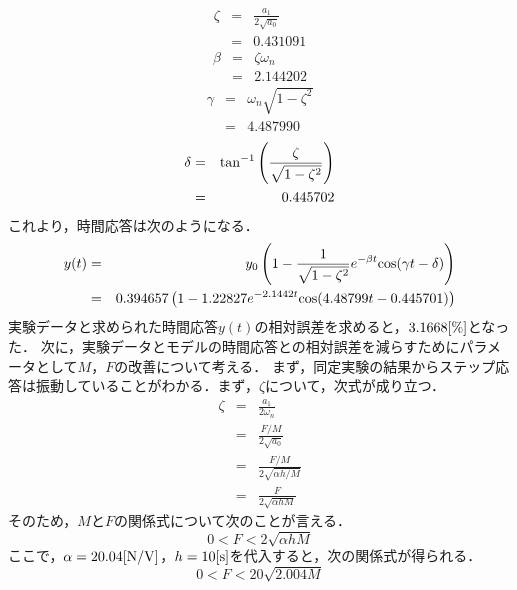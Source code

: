 \documentclass[12pt]{jsarticle}
\begin{document}
\begin{eqnarray}
  \label{StepResponse_calculate_zeta}
  \zeta &=& \frac{a_1}{2\sqrt{a_0}} \\
        &=& 0.431091 \nonumber
\end{eqnarray}
\begin{eqnarray}
  \label{StepResponse_calculate_beta}
  \beta &=& \zeta \omega_n \\
        &=& 2.144202 \nonumber
\end{eqnarray}
\begin{eqnarray}
  \label{StepResponse_calculate_gamma}
  \gamma &=& \omega_n\sqrt{1-\zeta^2} \\
         &=& 4.487990 \nonumber
\end{eqnarray}
\begin{eqnarray}
  \label{StepResponse_calculate_delta}
  \delta &=& {\rm tan}^{-1}\left(\frac{\zeta}{\sqrt{1-\zeta^2}}\right) \\
         &=& 0.445702 \nonumber
\end{eqnarray}
これより，時間応答は次のようになる．
\begin{eqnarray}
  \label{Response_y_t}
  y(t) &=& y_0\left(1 - \frac{1}{\sqrt{1-\zeta^2}}e^{-\beta t}{\rm cos}(\gamma t - \delta)\right) \\
       &=& 0.394657\left(1 - 1.22827e^{-2.1442 t}{\rm cos}(4.48799 t - 0.445701)\right) \nonumber
\end{eqnarray}
実験データと求められた時間応答$y(t)$の相対誤差を求めると，$3.1668{\rm [\%]}$となった．
次に，実験データとモデルの時間応答との相対誤差を減らすためにパラメータとして$M$，$F$の改善について考える．
まず，同定実験の結果からステップ応答は振動していることがわかる．まず，$\zeta$について，次式が成り立つ．
\begin{eqnarray}
  \label{MF_zeta}
  \zeta &=& \frac{a_1}{2\omega_n} \\
        &=& \frac{F/M}{2\sqrt{a_0}} \\
        &=& \frac{F/M}{2\sqrt{\alpha h / M}} \\
        &=& \frac{F}{2\sqrt{\alpha h M}}
\end{eqnarray}
そのため，$M$と$F$の関係式について次のことが言える．
\begin{equation}
  \label{MF_F_greater}
  0 < F < 2\sqrt{\alpha h M}
\end{equation}
ここで，$\alpha = 20.04{\rm [N/V]}$，$h = 10{\rm [s]}$を代入すると，次の関係式が得られる．
\begin{equation}
  \label{MF_F_greater}
  0 < F < 20\sqrt{2.004 M}
\end{equation}
\end{document}
